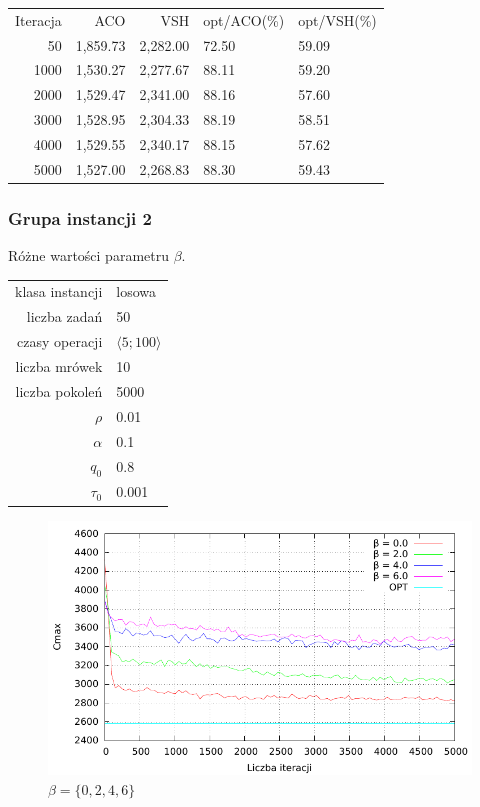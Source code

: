 \documentclass[10pt,a4paper]{article}
\begin{document}
\begin{tabular}{rrrll}
Iteracja & ACO & VSH  & opt/ACO(\%) & opt/VSH(\%) \\
50	& 1,859.73	& 2,282.00	& 72.50 &	59.09\\
1000	& 1,530.27	& 2,277.67	& 88.11 &	59.20\\
2000	& 1,529.47	& 2,341.00 &	88.16 &	57.60\\
3000	& 1,528.95	& 2,304.33 &	88.19 &	58.51\\
4000	& 1,529.55	& 2,340.17 &	88.15 &	57.62\\
5000	& 1,527.00	& 2,268.83 & 88.30 &	59.43\\

\end{tabular}

\newpage
\subsubsection{Grupa instancji 2}
Różne wartości parametru $\beta$.

\begin{center}
\begin{tabular}{|r|l|}
  \hline
  klasa instancji & losowa \\
  liczba zadań & 50 \\
  czasy operacji & $ \langle 5;100 \rangle $  \\
  liczba mrówek & 10 \\
  liczba pokoleń & 5000 \\
  $ \rho $ & 0.01 \\
  $ \alpha $ & 0.1 \\
  $ q_0 $ & 0.8 \\
  $ \tau_0 $ & 0.001 \\
  \hline
\end{tabular}
\end{center}

\begin{figure}[h]
    \centering
    \includegraphics{./figures/inst01_rnd_beta_smooth.pdf}
    \caption{$ \beta = \{ 0, 2, 4, 6 \} $}
\end{figure}
\end{document}
